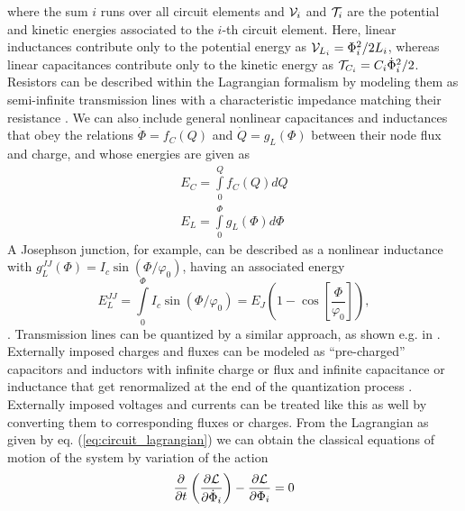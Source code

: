%
where the sum $i$ runs over all circuit elements and $\begin{mathcal}V\end{mathcal}_i$ and $\begin{mathcal}T\end{mathcal}_i$ are the potential and kinetic energies associated to the $i$-th circuit element. Here, linear inductances contribute only to the potential energy as $\begin{mathcal}V\end{mathcal}_{L_i} = \Phi_i^2/2L_i$, whereas linear capacitances contribute only to the kinetic energy as $\begin{mathcal}T\end{mathcal}_{C_i}=C_i\dot{\Phi}_i^2/2$. Resistors can be described within the Lagrangian formalism by modeling them as semi-infinite transmission lines with a characteristic impedance matching their resistance \citep{yurke_quantum_1984}. We can also include general nonlinear capacitances and inductances that obey the relations $\dot{\Phi}=f_C(Q)$ and $\dot{Q}=g_L(\Phi)$ between their node flux and charge, and whose energies are given as
%
\begin{eqnarray}
E_C = \int\limits_0^Q f_C(Q)dQ \\
E_L = \int\limits_0^\Phi g_L(\Phi)d\Phi
\end{eqnarray}
%
A Josephson junction, for example, can be described as a nonlinear inductance with $g_L^{JJ}(\Phi)=I_c\sin{(\Phi/\varphi_0)}$, having an associated energy
%
\begin{equation}
E_L^{JJ} = \int\limits_0^\Phi I_c\sin{\left(\Phi/\varphi_0\right)}=E_J(1-\cos{\left[\frac{\Phi}{\varphi_0}\right]}),
\end{equation}
%
. Transmission lines can be quantized by a similar approach, as shown e.g. in \citep{yurke_quantum_1984}. Externally imposed charges and fluxes can be modeled as ``pre-charged'' capacitors and inductors with infinite charge or flux and infinite capacitance or inductance that get renormalized at the end of the quantization process \citep{devoret_quantum_1995}. Externally imposed voltages and currents can be treated like this as well by converting them to corresponding fluxes or charges. From the Lagrangian as given by eq. (\ref{eq:circuit_lagrangian}) we can obtain the classical equations of motion of the system by variation of the action
%
\begin{equation}
\frac{\partial}{\partial t}\left( \frac{\partial \begin{mathcal}L\end{mathcal}}{\partial\dot{\Phi}_i}\right)-\frac{\partial \begin{mathcal}L\end{mathcal}}{\partial \Phi_i} = 0
\end{equation}
